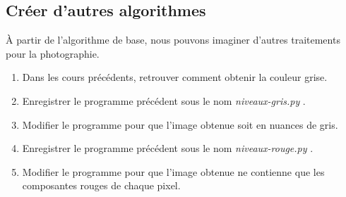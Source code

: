 \documentclass[a4paper,11pt]{article}
\begin{document}
\begin{Form}
\section{Créer d'autres algorithmes}
À partir de l'algorithme de base, nous pouvons imaginer d'autres traitements pour la photographie.
\begin{activite}
\begin{enumerate}
\item Dans les cours précédents, retrouver comment obtenir la couleur grise.
\item Enregistrer le programme précédent sous le nom \emph{niveaux-gris.py} .
\item Modifier le programme pour que l'image obtenue soit en nuances de gris.
\item Enregistrer le programme précédent sous le nom \emph{niveaux-rouge.py} .
\item Modifier le programme pour que l'image obtenue ne contienne que les composantes rouges de chaque pixel.
\end{enumerate}
\end{activite}
\end{Form}
\end{document}
